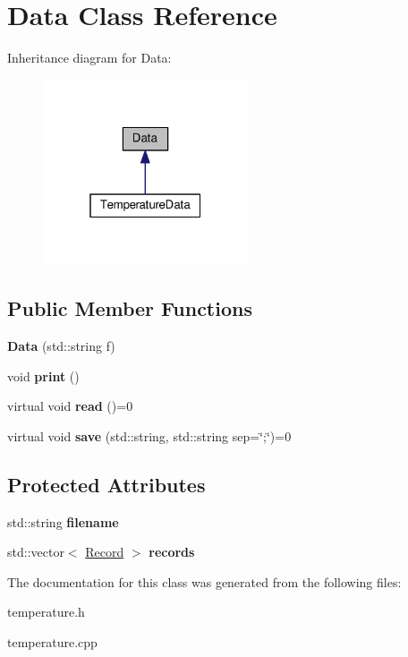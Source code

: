\hypertarget{classData}{}\section{Data Class Reference}
\label{classData}


Inheritance diagram for Data\+:\nopagebreak
\begin{figure}[H]
\begin{center}
\leavevmode
\includegraphics[width=172pt]{classData__inherit__graph}
\end{center}
\end{figure}
\subsection*{Public Member Functions}
\begin{DoxyCompactItemize}
\item 
{\bfseries Data} (std\+::string f)\hypertarget{classData_aaf6b0da495803c494a6c6a9f89021403}{}\label{classData_aaf6b0da495803c494a6c6a9f89021403}

\item 
void {\bfseries print} ()\hypertarget{classData_a779ce878d01483220b49ad9e513d7366}{}\label{classData_a779ce878d01483220b49ad9e513d7366}

\item 
virtual void {\bfseries read} ()=0\hypertarget{classData_a16a784e96cd5e92785a0c4f2824284c7}{}\label{classData_a16a784e96cd5e92785a0c4f2824284c7}

\item 
virtual void {\bfseries save} (std\+::string, std\+::string sep=\char`\"{};\char`\"{})=0\hypertarget{classData_abfbd034f17ac92ce1fbad5f148abb80c}{}\label{classData_abfbd034f17ac92ce1fbad5f148abb80c}

\end{DoxyCompactItemize}
\subsection*{Protected Attributes}
\begin{DoxyCompactItemize}
\item 
std\+::string {\bfseries filename}\hypertarget{classData_a2cbdf542620c5f62b3e504ea2cecffd0}{}\label{classData_a2cbdf542620c5f62b3e504ea2cecffd0}

\item 
std\+::vector$<$ \hyperlink{structRecord}{Record} $>$ {\bfseries records}\hypertarget{classData_ab886b83cfa461cc7def5c0e8ba870d7c}{}\label{classData_ab886b83cfa461cc7def5c0e8ba870d7c}

\end{DoxyCompactItemize}


The documentation for this class was generated from the following files\+:\begin{DoxyCompactItemize}
\item 
temperature.\+h\item 
temperature.\+cpp\end{DoxyCompactItemize}
